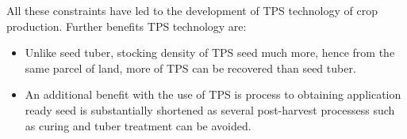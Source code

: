 \documentclass[
  openany]{book}
\providecommand{\tightlist}{%
  \setlength{\itemsep}{0pt}\setlength{\parskip}{0pt}}
\begin{document}
All these constraints have led to the development of TPS technology of crop production. Further benefits TPS technology are:

\begin{itemize}
\tightlist
\item
  Unlike seed tuber, stocking density of TPS seed much more, hence from the same parcel of land, more of TPS can be recovered than seed tuber.
\item
  An additional benefit with the use of TPS is process to obtaining application ready seed is substantially shortened as several post-harvest processess such as curing and tuber treatment can be avoided.
\end{itemize}

\begin{landscape}\begin{table}


\end{table}
\end{landscape}
\end{document}
